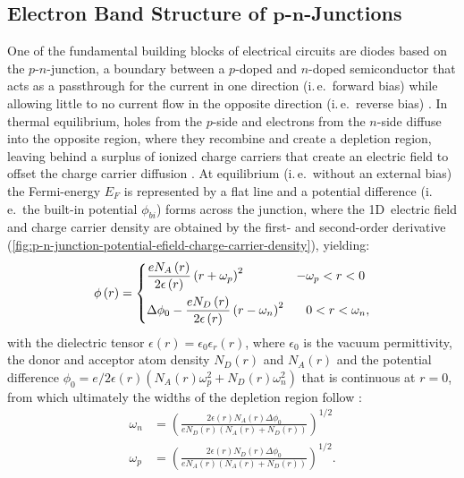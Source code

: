 \subsection[Electron Band Structure of \texorpdfstring{$p$-$n$}{\textit{p}-\textit{n}}-Junctions]{Electron Band Structure of $\boldsymbol{p}$-$\boldsymbol{n}$-Junctions} \label{ssec:band-structure-p-n-junctions}
One of the fundamental building blocks of electrical circuits are diodes based on the $p$-$n$-junction, a boundary between a $p$-doped and $n$-doped semiconductor that acts as a passthrough for the current in one direction (i.\,e.\ forward bias) while allowing little to no current flow in the opposite direction (i.\,e.\ reverse bias) \cite{Hook1991,Piprek2003,Kittel2004}. In thermal equilibrium, holes from the $p$-side and electrons from the $n$-side diffuse into the opposite region, where they recombine and create a depletion region, leaving behind a surplus of ionized charge carriers that create an electric field to offset the charge carrier diffusion \cite{Hook1991,Piprek2003,Kittel2004}. At equilibrium (i.\,e.\ without an external bias) the Fermi-energy $E_F$ is represented by a flat line and a potential difference (i.\,e.\ the built-in potential $\phi_{\mathit{bi}}$) forms across the junction, where the 1D~electric field and charge carrier density are obtained by the first- and second-order derivative (\cref{fig:p-n-junction-potential-efield-charge-carrier-density}), yielding:
\begin{equation}
  \label{eq:pn-junction-potential}
  \phi\left(r\right) =
  \begin{dcases}
    \frac{e N_A\left(r\right)}{2\epsilon\left(r\right) }\left(r + \omega_p\right)^2  & -\omega_p < r < 0 \\
    \Delta \phi_0 - \frac{e N_D\left(r\right)}{2\epsilon\left(r\right) }\left(r - \omega_n\right)^2 & \phantom{-}0 < r < \omega_n,
  \end{dcases}
\end{equation}
with the dielectric tensor $\epsilon\left(r\right) = \epsilon_0 \epsilon_r \left(r\right)$, where $\epsilon_0$ is the vacuum permittivity, the donor and acceptor atom density $N_D\left(r\right)$ and $N_A\left(r\right)$ and the potential difference $\phi_0 = e / 2 \epsilon\left(r\right)  \left(N_A\left(r\right) \omega_p^2 + N_D\left(r\right) \omega_n^2\right)$ that is continuous at $r = 0$, from which ultimately the widths of the depletion region follow \cite{Hook1991,Piprek2003,Kittel2004}:
\begin{align}
  \omega_n &= \left(\frac{2 \epsilon\left(r\right)  N_A\left(r\right) \Delta \phi_0}{e N_D\left(r\right) \left(N_A\left(r\right) + N_D\left(r\right)\right)}\right)^{1/2} \label{eq:depletion-region-width-n-region} \\
   \omega_p &= \left(\frac{2 \epsilon\left(r\right)  N_D\left(r\right) \Delta \phi_0}{e N_A\left(r\right) \left(N_A\left(r\right) + N_D\left(r\right)\right)}\right)^{1/2}. \label{eq:depletion-region-width-p-region}
\end{align}

